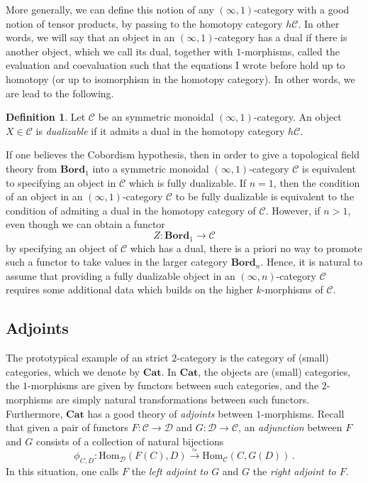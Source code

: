 \documentclass[a4paper,11pt]{article}
\newcommand{\Hom}{\mathrm{Hom}}
\newcommand{\ccal}{\mathcal{C}}
\newcommand{\dcal}{\mathcal{D}}
\theoremstyle{plain}
\theoremstyle{definition}
\newtheorem{defi}[thm]{Definition}
\theoremstyle{remark}
\begin{document}
More generally, we can define this notion of any $(\infty, 1)$-category with a good notion of tensor products, by passing to the homotopy category $h \ccal$. In other words, we will say that an object in an $(\infty, 1)$-category has a dual if there is another object, which we call its dual, together with $1$-morphisms, called the evaluation and coevaluation such that the equations I wrote before hold up to homotopy (or up to isomorphism in the homotopy category). In other words, we are lead to the following. 


\begin{defi}
Let $\ccal$ be an symmetric monoidal $(\infty, 1)$-category. An object $X \in \ccal$ is \textit{dualizable} if it admits a dual in the homotopy category $h \ccal$. 
\end{defi}

If one believes the Cobordism hypothesis, then in order to give a topological field theory from $\textbf{Bord}_1$ into a symmetric monoidal $(\infty, 1)$-category $\ccal$ is equivalent to specifying an object in $\ccal$ which is fully dualizable. If $n = 1$, then the condition of an object in an $(\infty, 1)$-category $\ccal$ to be fully dualizable is equivalent to the condition of admiting a dual in the homotopy category of $\ccal$. However, if $n >1$, even though we can obtain a functor 
$$Z \colon \textbf{Bord}_1 \to \ccal$$
by specifying an object of $\ccal$ which has a dual, there is a priori no way to promote such a functor to take values in the larger category $\textbf{Bord}_n$. Hence, it is natural to assume that providing a fully dualizable object in an $(\infty, n)$-category $\ccal$ requires some additional data which builds on the higher $k$-morphisms of $\ccal$. 


\subsection{Adjoints}

The prototypical example of an strict $2$-category is the category of (small) categories, which we denote by $\textbf{Cat}$. In $\textbf{Cat}$, the objects are (small) categories, the $1$-morphisms are given by functors between such categories, and the $2$-morphisms are simply natural transformations between such functors. Furthermore, $\textbf{Cat}$ has a good theory of \textit{adjoints} between $1$-morphisms. Recall that given a pair of functors $F \colon \ccal \to \dcal$ and $G \colon \dcal \to \ccal$, an \textit{adjunction} between $F$ and $G$ consists of a collection of natural bijections 
\begin{equation}
\label{adjoint_isos}
\phi_{C,D} \colon \Hom_{\dcal}(F(C), D) \xrightarrow{\simeq} \Hom_{\ccal}(C, G(D)) \, .
\end{equation}
In this situation, one calls $F$ the \textit{left adjoint to $G$} and $G$ the \textit{right adjoint to $F$}. 
\end{document}
